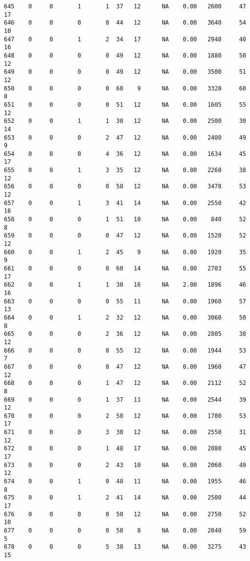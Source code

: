 \documentclass[
  letterpaper,
  DIV=11,
  numbers=noendperiod]{scrreprt}
\begin{document}
\begin{verbatim}
645    0     0       1       1  37   12      NA    0.00   2600     47      17
646    0     0       0       0  44   12      NA    0.00   3640     54      10
647    0     0       1       2  34   17      NA    0.00   2940     40      16
648    0     0       0       0  49   12      NA    0.00   1880     50      12
649    0     0       0       0  49   12      NA    0.00   3500     51      12
650    0     0       0       0  60    9      NA    0.00   3320     60       8
651    0     0       0       0  51   12      NA    0.00   1605     55      12
652    0     0       1       1  30   12      NA    0.00   2500     30      14
653    0     0       0       2  47   12      NA    0.00   2400     49       9
654    0     0       0       4  36   12      NA    0.00   1634     45      17
655    0     0       1       3  35   12      NA    0.00   2260     38      12
656    0     0       0       0  58   12      NA    0.00   3478     53      12
657    0     0       1       3  41   14      NA    0.00   2550     42      16
658    0     0       0       1  51   10      NA    0.00    840     52       8
659    0     0       0       0  47   12      NA    0.00   1520     52      12
660    0     0       1       2  45    9      NA    0.00   1920     35       9
661    0     0       0       0  60   14      NA    0.00   2703     55      17
662    0     0       1       1  30   16      NA    2.00   1896     46      16
663    0     0       0       0  55   11      NA    0.00   1960     57      13
664    0     0       1       2  32   12      NA    0.00   3060     50       8
665    0     0       0       2  36   12      NA    0.00   2805     38      12
666    0     0       0       0  55   12      NA    0.00   1944     53       7
667    0     0       0       0  47   12      NA    0.00   1960     47      12
668    0     0       0       1  47   12      NA    0.00   2112     52       8
669    0     0       0       1  37   11      NA    0.00   2544     39      12
670    0     0       0       2  50   12      NA    0.00   1700     53      17
671    0     0       0       3  30   12      NA    0.00   2550     31      12
672    0     0       0       1  48   17      NA    0.00   2080     45      17
673    0     0       0       2  43   10      NA    0.00   2060     49      12
674    0     0       1       0  48   11      NA    0.00   1955     46       8
675    0     0       1       2  41   14      NA    0.00   2500     44      17
676    0     0       0       0  50   12      NA    0.00   2750     52      10
677    0     0       0       0  58    8      NA    0.00   2040     59       5
678    0     0       0       5  38   13      NA    0.00   3275     43      15

\end{verbatim}
\end{document}
